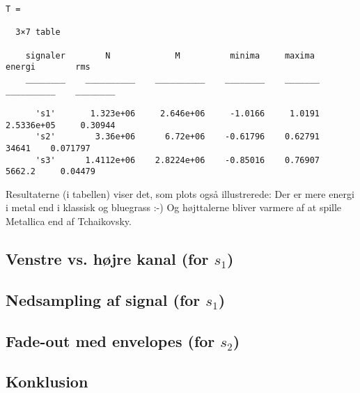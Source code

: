 \documentclass[a4paper]{report}
\begin{document}
        \color{lightgray} \begin{verbatim}
T =

  3×7 table

    signaler        N             M          minima     maxima       energi        rms   
    ________    __________    __________    ________    _______    __________    ________

      's1'       1.323e+06     2.646e+06     -1.0166     1.0191    2.5336e+05     0.30944
      's2'        3.36e+06      6.72e+06    -0.61796    0.62791         34641    0.071797
      's3'      1.4112e+06    2.8224e+06    -0.85016    0.76907        5662.2     0.04479

\end{verbatim} \color{black}
    \begin{par}
Resultaterne (i tabellen) viser det, som plots også illustrerede: Der er mere energi i metal end i klassisk og bluegrass :-) Og højttalerne bliver varmere af at spille Metallica end af Tchaikovsky.
\end{par} 



\section{Venstre vs. højre kanal (for $s_1$)}

        


\section{Nedsampling af signal (for $s_1$)}

        


\section{Fade-out med envelopes (for $s_2$)}

        \begin{par}
\chapter{Konklusion}
\end{par} 
\end{document}
